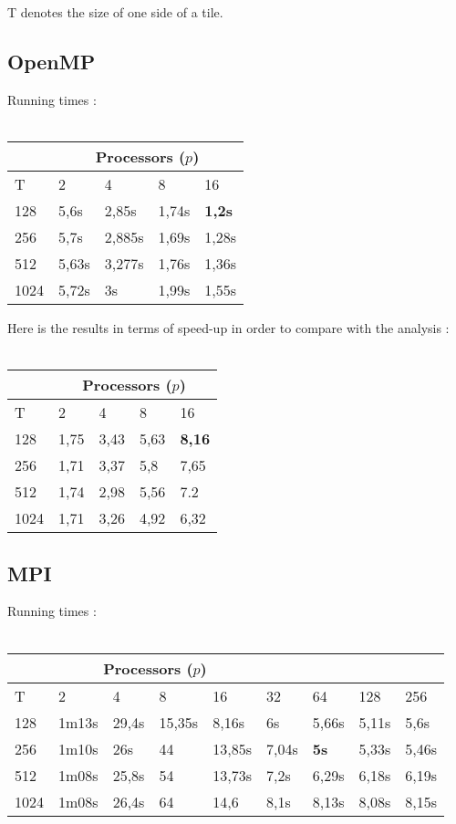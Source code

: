 T denotes the size of one side of a tile.
\subsection{OpenMP}
Running times : \\ \\
\begin{center}\begin{tabular}{|l||l|l|l|l|}
\hline
	& \multicolumn{4}{c|}{Processors ($p$)} \\
\hline
	T & 2 & 4 & 8 & 16\\
\hline
	128 & 5,6s & 2,85s & 1,74s & \textbf{1,2s}\\
\hline
	256 & 5,7s & 2,885s & 1,69s & 1,28s\\
\hline
	512 & 5,63s & 3,277s & 1,76s & 1,36s\\
\hline
	1024 & 5,72s & 3s & 1,99s & 1,55s\\
\hline
\end{tabular}\end{center}
\newpage
Here is the results in terms of speed-up in order to compare with the analysis : \\ \\
\begin{center}\begin{tabular}{|l||l|l|l|l|}
\hline
	& \multicolumn{4}{c|}{Processors ($p$)} \\
\hline
	T & 2 & 4 & 8 & 16\\
\hline
	128 & 1,75 & 3,43 &  5,63 &\textbf{8,16}\\
\hline
	256 & 1,71 & 3,37 & 5,8 & 7,65\\
\hline
	512 & 1,74 & 2,98 & 5,56 & 7.2\\
\hline
	1024 & 1,71 & 3,26 & 4,92 & 6,32\\
\hline
\end{tabular}
\end{center}
\subsection{MPI}
Running times : \\ \\
\begin{center}\begin{tabular}{|l||l|l|l|l|l|l|l|l|}
\hline
	& \multicolumn{4}{c|}{Processors ($p$)}\\
\hline
	T & 2 & 4 & 8 & 16 & 32 & 64 & 128 & 256\\
\hline
	128 & 1m13s & 29,4s & 15,35s & 8,16s & 6s & 5,66s & 5,11s & 5,6s\\
\hline
	256 & 1m10s & 26s & 44 & 13,85s & 7,04s & \textbf{5s} & 5,33s & 5,46s\\
\hline
	512 & 1m08s & 25,8s & 54 & 13,73s & 7,2s & 6,29s & 6,18s & 6,19s\\
\hline
	1024 & 1m08s & 26,4s & 64 & 14,6 & 8,1s & 8,13s & 8,08s & 8,15s\\
\hline
\end{tabular}
\end{center}